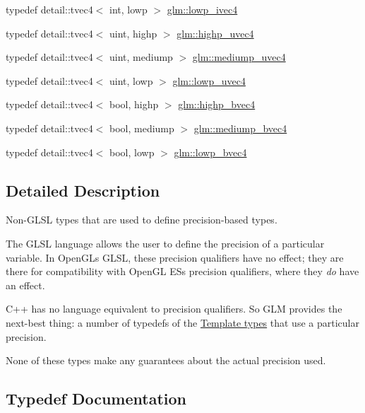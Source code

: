 \begin{DoxyCompactItemize}
\item 
typedef detail\+::tvec4$<$ int, lowp $>$ \hyperlink{group__core__precision_gab9b404ae623385d5094499d2d4e4616d}{glm\+::lowp\+\_\+ivec4}
\item 
typedef detail\+::tvec4$<$ uint, highp $>$ \hyperlink{group__core__precision_ga7cb8cc501f7e680e1889b93eb80e6c46}{glm\+::highp\+\_\+uvec4}
\item 
typedef detail\+::tvec4$<$ uint, mediump $>$ \hyperlink{group__core__precision_gad90c29c2643136a9bcb1165eac47c810}{glm\+::mediump\+\_\+uvec4}
\item 
typedef detail\+::tvec4$<$ uint, lowp $>$ \hyperlink{group__core__precision_ga17b5f652e5c64b0034065420d844fca7}{glm\+::lowp\+\_\+uvec4}
\item 
typedef detail\+::tvec4$<$ bool, highp $>$ \hyperlink{group__core__precision_ga381539af52c5e5c659700e12fb706eaf}{glm\+::highp\+\_\+bvec4}
\item 
typedef detail\+::tvec4$<$ bool, mediump $>$ \hyperlink{group__core__precision_ga8bb7cfe902e2cb356450d211ca4d58e2}{glm\+::mediump\+\_\+bvec4}
\item 
typedef detail\+::tvec4$<$ bool, lowp $>$ \hyperlink{group__core__precision_ga24c651dc8cb20779b3773428aef4f7f4}{glm\+::lowp\+\_\+bvec4}
\end{DoxyCompactItemize}


\subsection{Detailed Description}
Non-\/\+G\+L\+SL types that are used to define precision-\/based types. 

The G\+L\+SL language allows the user to define the precision of a particular variable. In Open\+GL\textquotesingle{}s G\+L\+SL, these precision qualifiers have no effect; they are there for compatibility with Open\+GL ES\textquotesingle{}s precision qualifiers, where they {\itshape do} have an effect.

C++ has no language equivalent to precision qualifiers. So G\+LM provides the next-\/best thing\+: a number of typedefs of the \hyperlink{group__core__template}{Template types} that use a particular precision.

None of these types make any guarantees about the actual precision used. 

\subsection{Typedef Documentation}
